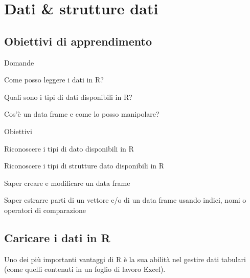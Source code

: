 \chapter{Dati \& strutture dati}
\label{cap:dati}

\section*{Obiettivi di apprendimento}


\begin{multicols}{2}
\begin{tcolorbox}[width=1\linewidth, halign=left, colframe=blue!60, colback=white, boxsep=1mm, arc=3mm]

Domande

\begin{myitemize}
	\item Come posso leggere i dati in R?
	\item Quali sono i tipi di dati disponibili in R?
	\item Cos'\`e un data frame e come lo posso manipolare?
\end{myitemize}

\end{tcolorbox} 
\columnbreak
\begin{tcolorbox}[width=1\linewidth, halign=left, colframe=blue!60, colback=white, boxsep=1mm, arc=3mm]

Obiettivi

\begin{myitemize}
	\item Riconoscere i tipi di dato disponibili in R
	\item Riconoscere i tipi di strutture dato disponibili in R
	\item Saper creare e modificare un data frame
	\item Saper estrarre parti di un vettore e/o di un data frame usando indici, nomi o operatori di comparazione
\end{myitemize}

\end{tcolorbox} 
\columnbreak
\end{multicols}


\section{Caricare i dati in R}
\label{sec:data_loading}

Uno dei pi\`u importanti vantaggi di R \`e la sua abilit\`a nel gestire dati tabulari (come quelli contenuti in un foglio di lavoro Excel). 

